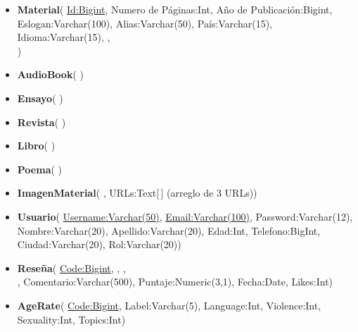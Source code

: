 \documentclass[12pt,a4paper]{article}
\begin{document}
\begin{itemize}
    \item
\textbf{Material}(
\uline{Id:Bigint},
Numero de Páginas:Int,
Año de Publicación:Bigint,
Eslogan:Varchar(100),
Alias:Varchar(50),
País:Varchar(15),
Idioma:Varchar(15),
,\\
)
 \vspace{0.2cm}
\item
\textbf{AudioBook}(
\uline{})
 \vspace{0.2cm}

\item
\textbf{Ensayo}(
\uline{})
 \vspace{0.2cm}

\item
\textbf{Revista}(
\uline{})
 \vspace{0.2cm}

\item
\textbf{Libro}(
\uline{})
 \vspace{0.2cm}

\item
\textbf{Poema}(
\uline{})
 \vspace{0.2cm}

\item
\textbf{ImagenMaterial}(
\uline{},
URLs:Text[\,] (arreglo de 3 URLs))
 \vspace{0.2cm}

\item
\textbf{Usuario}(
\uline{Username:Varchar(50)},
\uline{Email:Varchar(100)},
Password:Varchar(12),
Nombre:Varchar(20),
Apellido:Varchar(20),
Edad:Int,
Telefono:BigInt,
Ciudad:Varchar(20),
Rol:Varchar(20))

\item
\textbf{Reseña}(
\uline{Code:Bigint},
,
, \\
,
Comentario:Varchar(500),
Puntaje:Numeric(3,1),
Fecha:Date,
Likes:Int)



\item
\textbf{AgeRate}(
\uline{Code:Bigint},
Label:Varchar(5),
Language:Int,
Violence:Int,
Sexuality:Int,
Topics:Int)
 \vspace{0.2cm}


\end{itemize}
\end{document}
